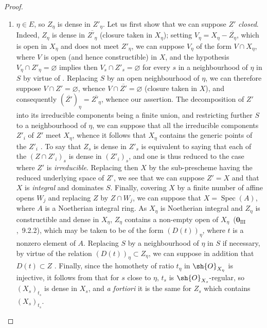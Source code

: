 \begin{proof}
\begin{enumerate}[label=\upshape{$\arabic{enumi}^\circ$}]
  \item\label{IV.9.5.3.case2} $\eta\in E$, so $Z_\eta$ is dense in $Z'_\eta$.
  Let us first show that we can suppose $Z'$ \emph{closed}.
  Indeed, $Z_\eta$ is dense in $\overline{Z'_\eta}$ (closure taken in $X_\eta$); setting $V_\eta=X_\eta-\overline{Z_\eta}$, which is open in $X_\eta$ and does not meet $Z'_\eta$, we can suppose $V_\eta$ of the form $V\cap X_\eta$, where $V$ is open (and hence constructible) in $X$, and the hypothesis $V_\eta\cap Z'_\eta=\varnothing$ implies then $V_s\cap Z'_s=\varnothing$ for every $s$ in a neighbourhood of $\eta$ in $S$ by virtue of .
  Replacing $S$ by an open neighbourhood of $\eta$, we can therefore suppose $V\cap Z'=\varnothing$, whence $V\cap\overline{Z'}=\varnothing$ (closure taken in $X$), and consequently $(\overline{Z'})_\eta=\overline{Z'_\eta}$, whence our assertion.
  The decomposition of $Z'$ into its irreducible components being a finite union, and restricting further $S$ to a neighbourhood of $\eta$, we can suppose that all the irreducible components $Z'_i$ of $Z'$ meet $X_\eta$, whence it follows that $X_\eta$ contains the generic points of the $Z'_i$ .
  To say that $Z_s$ is dense in $Z'_s$ is equivalent to saying that each of the $(Z\cap Z'_i)_s$ is dense in $(Z'_i)_s$, and one is thus reduced to the case where $Z'$ is \emph{irreducible}.
  Replacing then $X$ by the sub-prescheme having the reduced underlying space of $Z'$, we see that we can suppose $Z'=X$ and that $X$ is \emph{integral} and dominates $S$.
  Finally, covering $X$ by a finite number of affine opens $W_j$ and replacing $Z$ by $Z\cap W_j$, we can suppose that $X=\operatorname{Spec}(A)$, where $A$ is a Noetherian integral ring.
  As $X_\eta$ is Noetherian integral and $Z_\eta$ is constructible and dense in $X_\eta$, $Z_\eta$ contains a non-empty open of $X_\eta$~($\mathbf{0}_{\mathrm{III}}$,~9.2.2), which may be taken to be of the form $(D(t))_\eta$, where $t$ is a nonzero element of $A$.
  Replacing $S$ by a neighbourhood of $\eta$ in $S$ if necessary, by virtue of the relation $(D(t))_\eta\subset Z_\eta$, we can suppose in addition that $D(t)\subset Z$ .
  Finally, since the homothety of ratio $t_\eta$ in $\sh{O}_{X_\eta}$ is injective, it follows from  that for $s$ close to $\eta$, $t_s$ is $\sh{O}_{X_s}$-regular, so $(X_s)_{t_s}$ is dense in $X_s$, and \emph{a fortiori} it is the same for $Z_s$ which contains $(X_s)_{t_s}$.
\end{enumerate}
\end{proof}

